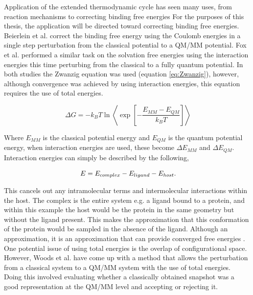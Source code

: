 Application of the extended thermodynamic cycle has seen many uses, from reaction mechanisms \cite{Warshel_free_energy_correction, ryde_qm-mm_extended_td} to correcting binding free energies \cite{essex_qmmm, fox_mm_to_qm, mullholland_qmmm}  For the purposes of this thesis, the application will be directed toward correcting binding free energies.  Beierlein et al. \cite{essex_qmmm} correct the binding free energy using the Coulomb energies in a single step perturbation from the classical potential to a QM/MM potential.  Fox et al. \cite{fox_mm_to_qm} performed a similar task on the solvation free energies using the interaction energies this time perturbing from the classical to a fully quantum potential.  In both studies the Zwanzig equation \cite{zwanzig} was used (equation \ref{eq:Zwanzig}), however, although convergence was achieved by using interaction energies, this equation requires the use of total energies.  

\begin{equation} \label{eq:Zwanzig}
\ \Delta G = -k_B T \ln \left\langle \exp \left[ - \frac{E_{MM} - E_{QM}}{k_B T}  \right] \right\rangle
\end{equation}

Where $E_{MM}$ is the classical potential energy and $E_{QM}$ is the quantum potential energy, when interaction energies are used, these become $\Delta E_{MM}$ and $\Delta E_{QM}$.  Interaction energies can simply be described by the following,

\begin{equation}
\ E= E_{complex}-E_{ligand}-E_{host} \\.
\end{equation}

This cancels out any intramolecular terms and intermolecular interactions within the host.  The complex is the entire system e.g. a ligand bound to a protein, and within this example the host would be the protein in the same geometry but without the ligand present.  This makes the approximation that this conformation of the protein would be sampled in the absence of the ligand.  Although an approximation, it is an approximation that can provide converged free energies \cite{essex_qmmm, fox_mm_to_qm}.  One potential issue of using total energies is the overlap of configurational space.  However, Woods et al. \cite{mullholland_qmmm} have come up with a method that allows the perturbation from a classical system to a QM/MM system with the use of total energies.  Doing this involved evaluating whether a classically obtained snapshot was a good representation at the QM/MM level and accepting or rejecting it.

